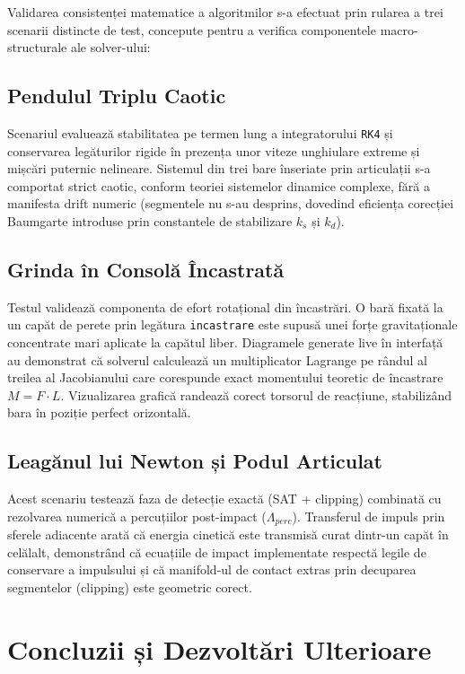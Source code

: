 \documentclass[12pt, a4paper]{article}
\begin{document}
Validarea consistenței matematice a algoritmilor s-a efectuat prin rularea a trei scenarii distincte de test, concepute pentru a verifica componentele macro-structurale ale solver-ului:

\subsection{Pendulul Triplu Caotic}
Scenariul evaluează stabilitatea pe termen lung a integratorului \texttt{RK4} și conservarea legăturilor rigide în prezența unor viteze unghiulare extreme și mișcări puternic nelineare. Sistemul din trei bare înseriate prin articulații s-a comportat strict caotic, conform teoriei sistemelor dinamice complexe, fără a manifesta drift numeric (segmentele nu s-au desprins, dovedind eficiența corecției Baumgarte introduse prin constantele de stabilizare $k_s$ și $k_d$).

\subsection{Grinda în Consolă Încastrată}
Testul validează componenta de efort rotațional din încastrări. O bară fixată la un capăt de perete prin legătura \texttt{incastrare} este supusă unei forțe gravitaționale concentrate mari aplicate la capătul liber. Diagramele generate live în interfață au demonstrat că solverul calculează un multiplicator Lagrange pe rândul al treilea al Jacobianului care corespunde exact momentului teoretic de încastrare $M = F \cdot L$. Vizualizarea grafică randează corect torsorul de reacțiune, stabilizând bara în poziție perfect orizontală.

\subsection{Leagănul lui Newton și Podul Articulat}
Acest scenariu testează faza de detecție exactă (SAT + clipping) combinată cu rezolvarea numerică a percuțiilor post-impact ($\Lambda_{perc}$). Transferul de impuls prin sferele adiacente arată că energia cinetică este transmisă curat dintr-un capăt în celălalt, demonstrând că ecuațiile de impact implementate respectă legile de conservare a impulsului și că manifold-ul de contact extras prin decuparea segmentelor (clipping) este geometric corect.

\section{Concluzii și Dezvoltări Ulterioare}
\end{document}
